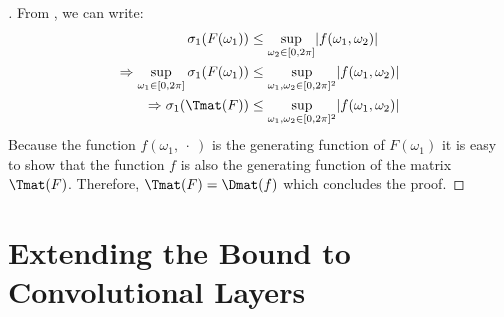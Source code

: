 \begin{proof}[]



  \noindent
  From , we can write:
  \begin{align}
      \sigma_{1}\left( F(\omega_1) \right) &\leq \sup_{\omega_2 \in [0,2\pi]} \left| f(\omega_1, \omega_2) \right| \\
      \Rightarrow \sup_{\omega_1 \in [0,2\pi]} \sigma_{1}\left( F(\omega_1) \right) &\leq  \sup_{\omega_1, \omega_2 \in [0,2\pi]^2} \left| f(\omega_1, \omega_2) \right| \\
      \Rightarrow \sigma_1\left(\Tmat(F) \right) &\leq \sup_{\omega_1, \omega_2 \in [0,2\pi]^2} \left| f(\omega_1, \omega_2) \right|
  \end{align}
  Because the function $f(\omega_1,\ \cdot\ )$ is the generating function of $F(\omega_1)$ it is easy to show that the function $f$ is also the generating function of the matrix $\Tmat(F)$. Therefore, $\Tmat(F) = \Dmat(f)$ which concludes the proof. 
\end{proof}


\section{Extending the Bound to Convolutional Layers}
\label{section:ch5-bound_on_the_singular_values_of_convolutional_layers}

